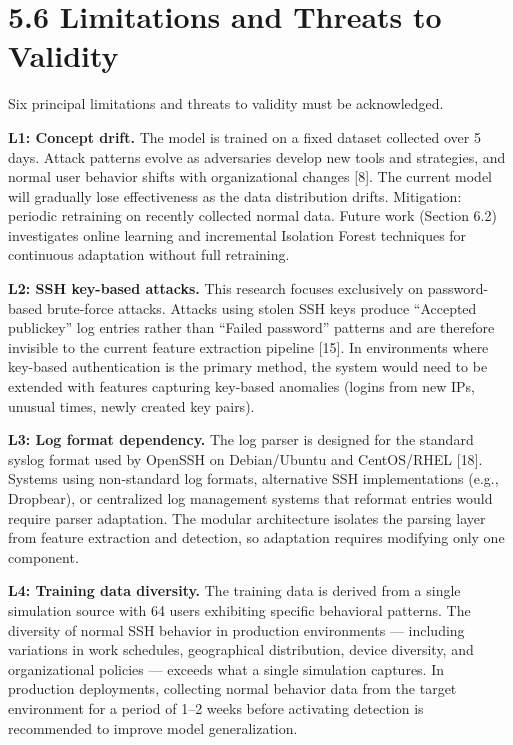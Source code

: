 \documentclass[
  a4paper]{report}
\begin{document}
\section{5.6 Limitations and Threats to
Validity}\label{limitations-and-threats-to-validity}

Six principal limitations and threats to validity must be acknowledged.

\textbf{L1: Concept drift.} The model is trained on a fixed dataset
collected over 5 days. Attack patterns evolve as adversaries develop new
tools and strategies, and normal user behavior shifts with
organizational changes {[}8{]}. The current model will gradually lose
effectiveness as the data distribution drifts. Mitigation: periodic
retraining on recently collected normal data. Future work (Section 6.2)
investigates online learning and incremental Isolation Forest techniques
for continuous adaptation without full retraining.

\textbf{L2: SSH key-based attacks.} This research focuses exclusively on
password-based brute-force attacks. Attacks using stolen SSH keys
produce ``Accepted publickey'' log entries rather than ``Failed
password'' patterns and are therefore invisible to the current feature
extraction pipeline {[}15{]}. In environments where key-based
authentication is the primary method, the system would need to be
extended with features capturing key-based anomalies (logins from new
IPs, unusual times, newly created key pairs).

\textbf{L3: Log format dependency.} The log parser is designed for the
standard syslog format used by OpenSSH on Debian/Ubuntu and CentOS/RHEL
{[}18{]}. Systems using non-standard log formats, alternative SSH
implementations (e.g., Dropbear), or centralized log management systems
that reformat entries would require parser adaptation. The modular
architecture isolates the parsing layer from feature extraction and
detection, so adaptation requires modifying only one component.

\textbf{L4: Training data diversity.} The training data is derived from
a single simulation source with 64 users exhibiting specific behavioral
patterns. The diversity of normal SSH behavior in production
environments --- including variations in work schedules, geographical
distribution, device diversity, and organizational policies --- exceeds
what a single simulation captures. In production deployments, collecting
normal behavior data from the target environment for a period of 1--2
weeks before activating detection is recommended to improve model
generalization.
\end{document}
